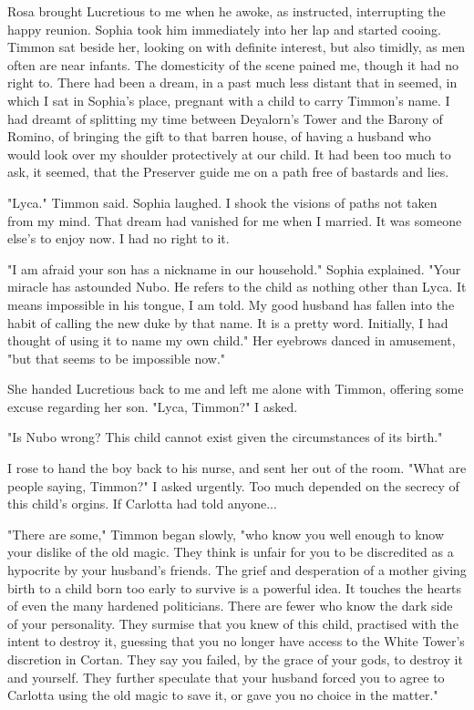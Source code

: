 \documentclass{article}
\begin{document}
Rosa brought Lucretious to me when he awoke, as instructed, interrupting the happy reunion. Sophia took him immediately into her lap and started cooing. Timmon sat beside her, looking on with definite interest, but also timidly, as men often are near infants. The domesticity of the scene pained me, though it had no right to. There had been a dream, in a past much less distant that in seemed, in which I sat in Sophia's place, pregnant with a child to carry Timmon's name. I had dreamt of splitting my time between Deyalorn's Tower and the Barony of Romino, of bringing the gift to that barren house, of having a husband who would look over my shoulder protectively at our child. It had been too much to ask, it seemed, that the Preserver guide me on a path free of bastards and lies. 

"Lyca." Timmon said. Sophia laughed. I shook the visions of paths not taken from my mind. That dream had vanished for me when I married. It was someone else's to enjoy now. I had no right to it.

"I am afraid your son has a nickname in our household." Sophia explained. "Your miracle has astounded Nubo. He refers to the child as nothing other than Lyca. It means impossible in his tongue, I am told. My good husband has fallen into the habit of calling the new duke by that name. It is a pretty word. Initially, I had thought of using it to name my own child." Her eyebrows danced in amusement, "but that seems to be impossible now."

She handed Lucretious back to me and left me alone with Timmon, offering some excuse regarding her son. "Lyca, Timmon?" I asked.

"Is Nubo wrong? This child cannot exist given the circumstances of its birth."

I rose to hand the boy back to his nurse, and sent her out of the room. "What are people saying, Timmon?" I asked urgently. Too much depended on the secrecy of this child's orgins. If Carlotta had told anyone...

"There are some," Timmon began slowly, "who know you well enough to know your dislike of the old magic. They think is unfair for you to be discredited as a hypocrite by your husband's friends. The grief and desperation of a mother giving birth to a child born too early to survive is a powerful idea. It touches the hearts of even the many hardened politicians. There are fewer who know the dark side of your personality. They surmise that you knew of this child, practised with the intent to destroy it, guessing that you no longer have access to the White Tower's discretion in Cortan. They say you failed, by the grace of your gods, to destroy it and yourself. They further speculate that your husband forced you to agree to Carlotta using the old magic to save it, or gave you no choice in the matter."
\end{document}
